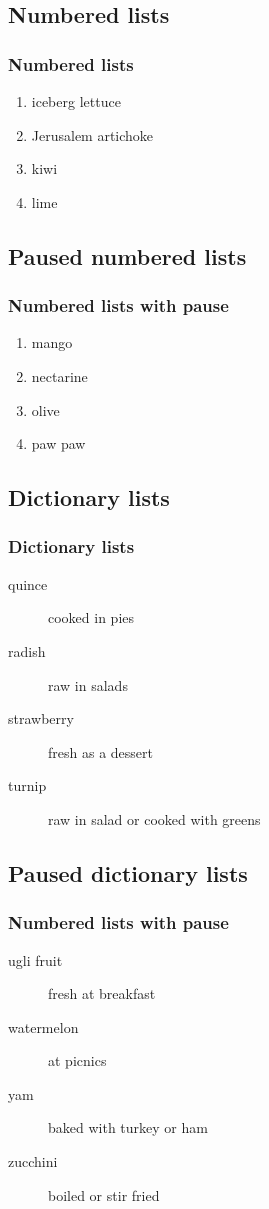 \begin{realverbatim}
    \subsection{Numbered lists}
    \begin{frame}
        \frametitle{Numbered lists}
        \begin{enumerate}
            \item{iceberg lettuce}
            \item{Jerusalem artichoke}
            \item{kiwi}
            \item{lime}
        \end{enumerate}
    \end{frame}
    \subsection{Paused numbered lists}
    \begin{frame}
        \frametitle{Numbered lists with pause}
        \begin{enumerate}
            \item{mango}
            \pause
            \item{nectarine}
            \pause
            \item{olive} 
            \pause
            \item{paw paw}
        \end{enumerate}
    \end{frame}
    \subsection{Dictionary lists}
    \begin{frame}
        \frametitle{Dictionary lists}
        \begin{description}
            \item[quince]{cooked in pies}
            \item[radish]{raw in salads}
            \item[strawberry]{fresh as a dessert}
            \item[turnip]{raw in salad or cooked with greens}
        \end{description}
    \end{frame}
    \subsection{Paused dictionary lists}
    \begin{frame}
        \frametitle{Numbered lists with pause}
        \begin{description}
            \item[ugli fruit]{fresh at breakfast}
            \pause
            \item[watermelon]{at picnics}
            \pause
            \item[yam]{baked with turkey or ham}
            \pause
            \item[zucchini]{boiled or stir fried}
        \end{description}
    \end{frame}

\end{realverbatim}
